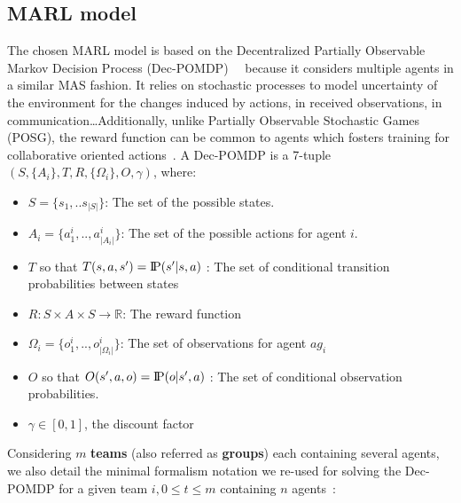 \documentclass[runningheads]{llncs}
\newcommand{\probP}{\text{I\kern-0.15em P}}
\begin{document}
\subsection{MARL model}

The chosen MARL model is based on the Decentralized Partially Observable Markov Decision Process (Dec-POMDP)~~\cite{Oliehoek2016} because it considers multiple agents in a similar MAS fashion. It relies on stochastic processes to model uncertainty of the environment for the changes induced by actions, in received observations, in communication\dots Additionally, unlike Partially Observable Stochastic Games (POSG), the reward function can be common to agents which fosters training for collaborative oriented actions~\cite{Beynier2013}.
A Dec-POMDP is a 7-tuple $(S,\{A_i\},T,R,\{\Omega_i\},O,\gamma)$, where:
\begin{itemize}
    \item $S = \{s_1, ..s_{|S|}\}$: The set of the possible states.
    \item $A_{i} = \{a_{1}^{i},..,a_{|A_{i}|}^{i}\}$: The set of the possible actions for agent $i$.
    \item $T$ so that $T(s,a,s') = \probP{(s'|s,a)}$ : The set of conditional transition probabilities between states
    \item $R: S \times A \times S \rightarrow \mathbb{R}$: The reward function
    \item $\Omega_{i} = \{o_{1}^{i},..,o_{|\Omega_{i}|}^{i}\}$: The set of observations for agent $ag_i$
    \item $O$ so that $O(s',a,o) = \probP{(o|s',a)}$ : The set of conditional observation probabilities.
    \item $\gamma \in [0,1]$, the discount factor
\end{itemize}

Considering $m$ \textbf{teams} (also referred as \textbf{groups}) each containing several agents, we also detail the minimal formalism notation we re-used for solving the Dec-POMDP for a given team $i, 0 \leq t \leq m$ containing $n$ agents~\cite{Beynier2013,Albrecht2024}:
\end{document}
